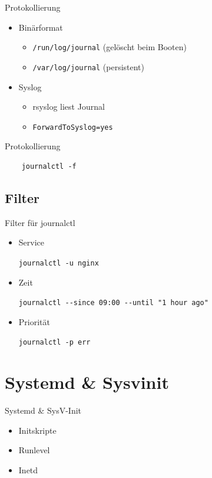 \begin{frame}[fragile]{Protokollierung}
\begin{itemize}
\item Binärformat
\begin{itemize}
\item \verb|/run/log/journal| (gelöscht beim Booten)
\item \verb|/var/log/journal| (persistent)
\end{itemize}
\item Syslog
	\begin{itemize}
	\item rsyslog liest Journal
	\item \verb|ForwardToSyslog=yes|
	\end{itemize}
\end{itemize}
\end{frame}

\begin{frame}[fragile]{Protokollierung}
  \begin{lstlisting}
    journalctl -f
    \end{lstlisting}
\end{frame}
  
\subsection{Filter}

\begin{frame}[fragile]{Filter für journalctl}
  \begin{itemize}
  \item Service

	  \verb|journalctl -u nginx|
  \item Zeit

	  \verb|journalctl --since 09:00 --until "1 hour ago"|
  \item Priorität

	  \verb|journalctl -p err|
  \end{itemize}
\end{frame}

\section{Systemd \& Sysvinit}

\begin{frame}{Systemd \& SysV-Init}
  \begin{itemize}
  \item Initskripte
  \item Runlevel
  \item Inetd
  \end{itemize}
\end{frame}

